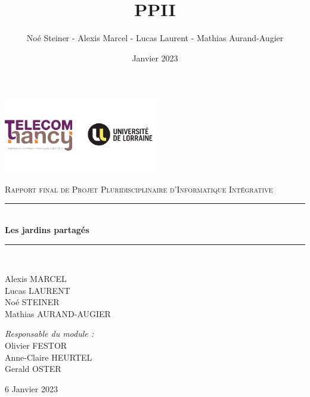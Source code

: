 \documentclass[french,a4paper]{article}
\title{PPII}
\author{Noé Steiner - Alexis Marcel - Lucas Laurent - Mathias Aurand-Augier}
\date{Janvier 2023}
\newcommand{\HRule}{\rule{\linewidth}{0.5mm}}
\begin{document}

\begin{titlepage}
    \begin{center}

    \includegraphics[width=0.5\textwidth]{tele_univ.png}

    \textsc{\Large Rapport final de Projet Pluridisciplinaire d'Informatique Intégrative}\\[1.5cm]

    \HRule \\[0.4cm]
    { \huge \bfseries Les jardins partagés\\[0.4cm] }

    \HRule \\[2cm]

    \begin{minipage}{0.4\textwidth}
      \begin{flushleft} \large
        Alexis MARCEL\\
        Lucas LAURENT\\
        Noé STEINER\\
        Mathias AURAND-AUGIER\\
      \end{flushleft}
    \end{minipage}
    \begin{minipage}{0.4\textwidth}
      \begin{flushright} \large
        \emph{Responsable du module :}\\
        Olivier FESTOR\\
        Anne-Claire HEURTEL\\
        Gerald OSTER\\
      \end{flushright}
    \end{minipage}

    \vfill

    {\large 6 Janvier 2023}

  \end{center}
\end{titlepage}
\newpage
\tableofcontents
\newpage
\end{document}
